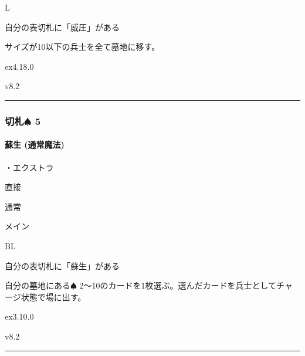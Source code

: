 \documentclass[letterpaper,10pt,dvipdfmx]{sphinxmanual}
\begin{document}
\sphinxAtStartPar
{} L

\sphinxAtStartPar
{}

\sphinxAtStartPar
自分の表切札に「威圧」がある

\sphinxAtStartPar
{}

\sphinxAtStartPar
サイズが10以下の兵士を全て墓地に移す。

\sphinxAtStartPar
{}  ex4.18.0

\sphinxAtStartPar
{}  v8.2


\bigskip\hrule\bigskip



\subsubsection{切札{\normalsize $\spadesuit$} 5}
\label{\detokenize{auto/frameActionlist:id22}}

\paragraph{蘇生 (通常魔法)}
\label{\detokenize{auto/frameActionlist:act-resurrection}}\label{\detokenize{auto/frameActionlist:id23}}
\sphinxAtStartPar
{}

\sphinxAtStartPar
・エクストラ

\sphinxAtStartPar
{} 直接

\sphinxAtStartPar
{} 通常

\sphinxAtStartPar
{} メイン

\sphinxAtStartPar
{} BL

\sphinxAtStartPar
{}

\sphinxAtStartPar
自分の表切札に「蘇生」がある

\sphinxAtStartPar
{}

\sphinxAtStartPar
自分の墓地にある{\normalsize $\spadesuit$} 2〜10のカードを1枚選ぶ。選んだカードを兵士としてチャージ状態で場に出す。

\sphinxAtStartPar
{}  ex3.10.0

\sphinxAtStartPar
{}  v8.2


\bigskip\hrule\bigskip
\end{document}
